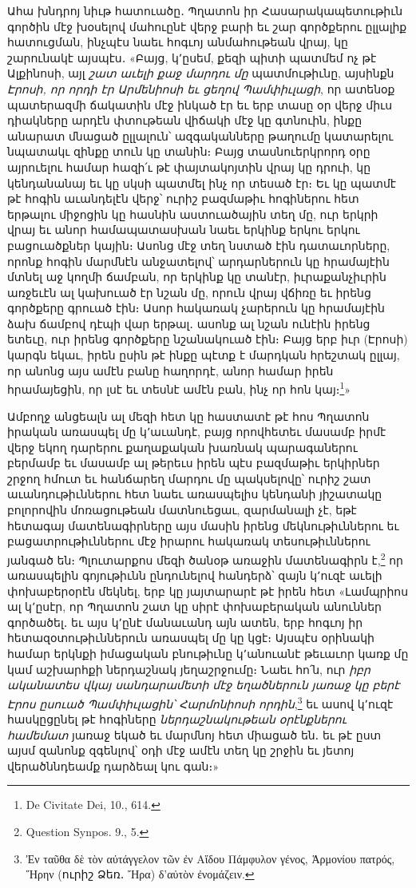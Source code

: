 \documentclass{article}
\begin{document}
{Ահա խնդրոյ նիւթ հատուածը․ Պղատոն իր Հասարակապետութիւն գործին մէջ խօսելով մահուընէ վերջ բարի եւ շար գործքերու ըլլալիք հատուցման, ինչպէս նաեւ հոգւոյ անմահութեան վրայ, կը շարունակէ այսպէս․ «Բայց, կ՚ըսեմ, քեզի պիտի պատմեմ ոչ թէ Ալքինոսի, այլ \emph{շատ աւելի քաջ մարդու մը} պատմութիւնը, այսինքն \emph{Էրոսի, որ որդի էր Արմենիոսի եւ ցեղով Պամփիւլացի}, որ ատենօք պատերազմի ճակատին մէջ ինկած էր եւ երբ տասը օր վերջ միւս դիակները արդէն փտութեան վիճակի մէջ կը գտնուին, ինքը անարատ մնացած ըլլալուն՝ ազգականները թաղումը կատարելու նպատակւ զինքը տուն կը տանին։ Բայց տասնուերկրորդ օրը այրուելու համար հազի՛ւ թէ փայտակոյտին վրայ կը դրուի, կը կենդանանայ եւ կը սկսի պատմել ինչ որ տեսած էր։ Եւ կը պատմէ թէ հոգին աւանդելէն վերջ՝ ուրիշ բազմաթիւ հոգիներու հետ երթալու միջոցին կը հասնին աստուածային տեղ մը, ուր երկրի վրայ եւ անոր համապատասխան նաեւ երկինք երկու երկու բացուածքներ կային։ Ասոնց մէջ տեղ նստած էին դատաւորները, որոնք հոգին մարմնէն անջատելով՝ արդարներուն կը հրամայէին մտնել աջ կողմի ճամբան, որ երկինք կը տանէր, իւրաքանչիւրին առջեւէն ալ կախուած էր նշան մը, որուն վրայ վճիռը եւ իրենց գործքերը գրուած էին։ Ասոր հակառակ չարերուն կը հրամայէին ձախ ճամբով դէպի վար երթալ․ ասոնք ալ նշան ունէին իրենց ետեւը, ուր իրենց գործքերը նշանակուած էին։ Բայց երբ իւր (Էրոսի) կարգն եկաւ, իրեն ըսին թէ ինքը պէտք է մարդկան հրեշտակ ըլլայ, որ անոնց այս ամէն բանը հաղորդէ, անոր համար իրեն հրամայեցին, որ լսէ եւ տեսնէ ամէն բան, ինչ որ հոն կայ։\footnote{De Civitate Dei, 10., 614.}»

Ամբողջ անցեալն ալ մեզի հետ կը հաստատէ թէ հոս Պղատոն իրական առասպել մը կ՚աւանդէ, բայց որովհետեւ մասամբ իրմէ վերջ եկող դարերու քաղաքական խառնակ պարագաներու բերմամբ եւ մասամբ ալ թերեւս իրեն պէս բազմաթիւ երկիրներ շրջող հմուտ եւ հանճարեղ մարդու մը պակսելովը՝ ուրիշ շատ աւանդութիւններու հետ նաեւ առասպելիս կենդանի յիշատակը բոլորովին մոռացութեան մատնուեցաւ, զարմանալի չէ, եթէ հետագայ մատենագիրները այս մասին իրենց մեկնութիւններու եւ բացատրութիւններու մէջ իրարու հակառակ տեսութիւններու յանգած են։ Պլուտարքոս մեզի ծանօթ առաջին մատենագիրն է,\footnote{Question Synpos. 9., 5.} որ առասպելին գոյութիւնն ընդունելով հանդերձ՝ զայն կ՚ուզէ աւելի փոխաբերօրէն մեկնել, երբ կը յայտարարէ թէ իրեն հետ «Լամպրիոս ալ կ՚ըսէր, որ Պղատոն շատ կը սիրէ փոխաբերական անուններ գործածել․ եւ այս կ՚ընէ մանաւանդ այն ատեն, երբ հոգւոյ իր հետազօտութիւններուն առասպել մը կը կցէ։ Այսպէս օրինակի համար երկնքի իմացական բնութիւնը կ՚անուանէ թեւաւոր կառք մը կամ աշխարհքի ներդաշնակ յեղաշրջումը։ Նաեւ հո՛ն, ուր \emph{իբր ականատես վկայ սանդարամետի մէջ եղածներուն յառաջ կը բերէ Էրոս ըսուած Պամփիւլացին՝ Հարմոնիոսի որդին},\footnote{Ἐν ταῦθα δὲ τὸν αὐτάγγελον τῶν ἐν Αἵδου Πάμφυλον γένος, Ἁρμονίου πατρός, Ἤρην (ուրիշ Ձեռ․ Ἤρα) δ’αὐτὸν ἐνομάζειν.} եւ ասով կ՚ուզէ հասկըցընել թէ հոգիները \emph{ներդաշնակութեան օրէնքներու համեմատ} յառաջ եկած եւ մարմնոյ հետ միացած են․ եւ թէ ըստ այսմ զանոնք զգենլով՝ օդի մէջ ամէն տեղ կը շրջին եւ յետոյ վերածննդեամք դարձեալ կու գան։»

}
\end{document}

